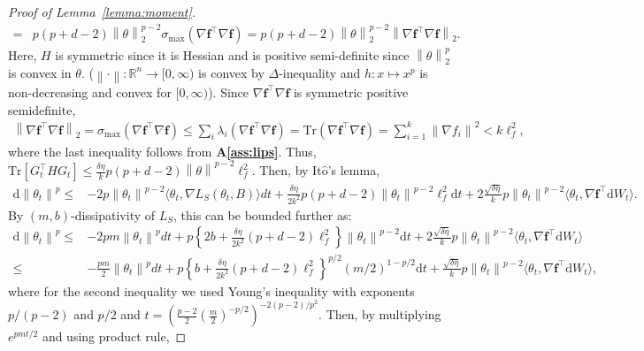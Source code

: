 \documentclass{article}
\newcommand{\norm}[1]{\left\lVert#1\right\rVert} %
\begin{document}
\begin{proof}[Proof of Lemma~\ref{lemma:moment}]
\begin{align*}
		= &   p(p+d-2)\norm{\theta}_2^{p-2} \sigma_{\max} (\nabla \mathbf{f}^\top \nabla \mathbf{f}) = p(p+d-2)\norm{\theta}_2^{p-2} \norm{\nabla \mathbf{f}^\top \nabla \mathbf{f}}_2.
	\end{align*}
	\endgroup
	Here, $H$ is symmetric since it is Hessian and is positive semi-definite since $\norm{\theta}_2^p$ is convex in $\theta$. ($\norm{\cdot}: \mathbb{R}^n \rightarrow [0, \infty)$ is convex by $\Delta$-inequality and $h: x \mapsto x^p $ is non-decreasing and convex for $[0, \infty)$).
	Since $\nabla \mathbf{f}^\top \nabla \mathbf{f}$ is symmetric positive semidefinite, 
	\begin{align*}
		\norm{\nabla \mathbf{f}^\top \nabla \mathbf{f}}_2 =\sigma_{\max} (\nabla \mathbf{f}^\top \nabla \mathbf{f}) \leq \sum_i \lambda_i (\nabla \mathbf{f}^\top \nabla \mathbf{f})  = \mathrm{Tr}(\nabla \mathbf{f}^\top \nabla \mathbf{f}) =  \sum_{i=1}^k \norm{\nabla f_i}^2 < k \ell_f^2,
	\end{align*}
	where the last inequality follows from \textbf{A\ref{ass:lips}}. Thus, $\mathrm{Tr}[G_t^\top H G_t] \leq	\frac{\delta \eta}{k}  p(p+d-2)\norm{\theta}^{p-2} \ell_f^2$. Then, by It$\hat{\mathrm{o}}$'s lemma,
	\begin{align*}
		\mathrm{d}\norm{\theta_t}^p \leq& 
		 -2 p\norm{\theta_t}^{p-2} \langle \theta_t, \nabla L_S(\theta_t, B) \rangle dt + \frac{\delta \eta}{2 k^2}  p(p+d-2)\norm{\theta_t}^{p-2} \ell_f^2  \mathrm{d}t+2 \frac{\sqrt{\delta \eta}}{k} p\norm{\theta_t}^{p-2} \langle \theta_t, \nabla \textbf{f}^\top \mathrm{d}W_t \rangle.
	\end{align*}
	By $(m,b)$-dissipativity of $L_S$, this can be bounded further as:
	\begin{align*}
		\mathrm{d}\norm{\theta_t}^p \leq &  -2 pm \norm{\theta_t}^{p} dt + p \left\{2b +\frac{\delta \eta}{2 k^2} (p+d-2) \ell_f^2\right\}   \norm{\theta_t}^{p-2} \mathrm{d}t + 2 \frac{\sqrt{\delta \eta}}{k} p\norm{\theta_t}^{p-2} \langle \theta_t, \nabla \textbf{f}^\top \mathrm{d}W_t \rangle\\
		\leq &  -\frac{pm}{2} \norm{\theta_t}^{p} dt + p \left\{b +\frac{\delta \eta}{2 k^2} (p+d-2)   \ell_f^2 \right\}^{p/2}   (m/2)^{1-p/2} \mathrm{d}t+ \frac{\sqrt{\delta \eta}}{k} p\norm{\theta_t}^{p-2} \langle \theta_t, \nabla \textbf{f}^\top \mathrm{d}W_t \rangle,
	\end{align*}
	where for the second inequality we used Young's inequality with exponents $p/(p-2)$ and $p/2$ and $t = \left( \frac{p-2}{2} \left(\frac{m}{2} \right)^{-p/2}\right)^{-2(p-2)/p^2}$.
	Then, by multiplying $e^{pmt/2}$ and using product rule,

\end{proof}
\end{document}
